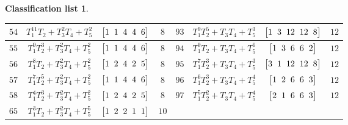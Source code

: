 \documentclass[10pt,a4paper]{amsart}
\theoremstyle{definition}
\newtheorem{class-list}[thm]{Classification list}
\numberwithin{equation}{section}
\begin{document}
\begin{class-list}
\begin{table}[t!]
\begin{tabu}{c|c|c|c||c|c|c|c}
\\
\hline
${54}$&${T_{1}^{11}T_{2}+T_{3}^{2}T_{4}+T_{5}^{2}}$
&$\arraycolsep=1mm\begin{bmatrix}{1} & {1} & {4} & {4} & {6}\end{bmatrix}$&${8}$
&${93}$&${T_{1}^{9}T_{2}^{5}+T_{3}T_{4}+T_{5}^{3}}$
&$\arraycolsep=1mm\begin{bmatrix}{1} & {3} & {12} & {12} & {8}\end{bmatrix}$&${12}$
\\
\hline
${55}$&${T_{1}^{9}T_{2}^{3}+T_{3}^{2}T_{4}+T_{5}^{2}}$
&$\arraycolsep=1mm\begin{bmatrix}{1} & {1} & {4} & {4} & {6}\end{bmatrix}$&${8}$
&${94}$&${T_{1}^{9}T_{2}+T_{3}T_{4}+T_{5}^{6}}$
&$\arraycolsep=1mm\begin{bmatrix}{1} & {3} & {6} & {6} & {2}\end{bmatrix}$&${12}$
\\
\hline
${56}$&${T_{1}^{8}T_{2}+T_{3}^{2}T_{4}+T_{5}^{2}}$
&$\arraycolsep=1mm\begin{bmatrix}{1} & {2} & {4} & {2} & {5}\end{bmatrix}$&${8}$
&${95}$&${T_{1}^{7}T_{2}^{3}+T_{3}T_{4}+T_{5}^{3}}$
&$\arraycolsep=1mm\begin{bmatrix}{3} & {1} & {12} & {12} & {8}\end{bmatrix}$&${12}$
\\
\hline
${57}$&${T_{1}^{7}T_{2}^{5}+T_{3}^{2}T_{4}+T_{5}^{2}}$
&$\arraycolsep=1mm\begin{bmatrix}{1} & {1} & {4} & {4} & {6}\end{bmatrix}$&${8}$
&${96}$&${T_{1}^{6}T_{2}^{3}+T_{3}T_{4}+T_{5}^{4}}$
&$\arraycolsep=1mm\begin{bmatrix}{1} & {2} & {6} & {6} & {3}\end{bmatrix}$&${12}$
\\
\hline
${58}$&${T_{1}^{4}T_{2}^{3}+T_{3}^{2}T_{4}+T_{5}^{2}}$
&$\arraycolsep=1mm\begin{bmatrix}{1} & {2} & {4} & {2} & {5}\end{bmatrix}$&${8}$
&${97}$&${T_{1}^{5}T_{2}^{2}+T_{3}T_{4}+T_{5}^{4}}$
&$\arraycolsep=1mm\begin{bmatrix}{2} & {1} & {6} & {6} & {3}\end{bmatrix}$&${12}$
\\
\hline
${65}$&${T_{1}^{3}T_{2}+T_{3}^{2}T_{4}+T_{5}^{5}}$
&$\arraycolsep=1mm\begin{bmatrix}{1} & {2} & {2} & {1} & {1}\end{bmatrix}$&${10}$

\end{tabu}
\end{table}
\end{class-list}
\end{document}
